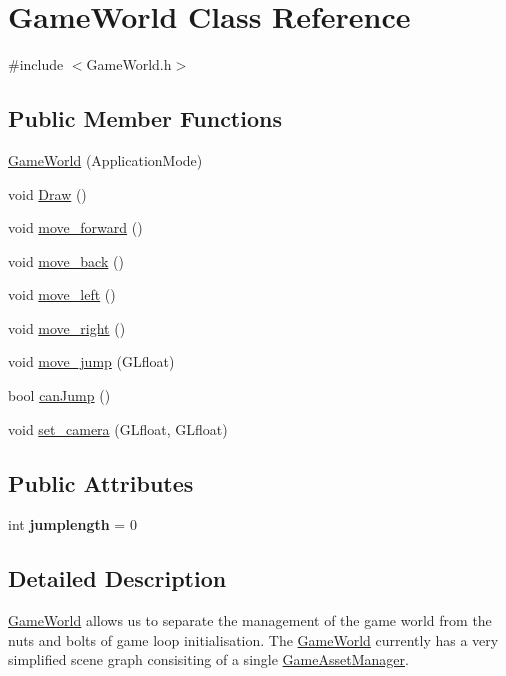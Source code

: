 \hypertarget{classGameWorld}{}\section{Game\+World Class Reference}
\label{classGameWorld}


{\ttfamily \#include $<$Game\+World.\+h$>$}

\subsection*{Public Member Functions}
\begin{DoxyCompactItemize}
\item 
\hyperlink{classGameWorld_a17a84e57a80600961088afc753036f89}{Game\+World} (Application\+Mode)
\item 
void \hyperlink{classGameWorld_a275418607d8286979b276f165ad5876b}{Draw} ()
\item 
void \hyperlink{classGameWorld_a863eb5b4a6d30e050543490b73c03351}{move\+\_\+forward} ()
\item 
void \hyperlink{classGameWorld_a0a6ee18221d04443c70a63951f098f10}{move\+\_\+back} ()
\item 
void \hyperlink{classGameWorld_a87e9cc176c5958342b54e33e76bf6227}{move\+\_\+left} ()
\item 
void \hyperlink{classGameWorld_a96063357a010c28ba7ef3ceb691fc897}{move\+\_\+right} ()
\item 
void \hyperlink{classGameWorld_a827a524c738a252fe1ab87f45fcece71}{move\+\_\+jump} (G\+Lfloat)
\item 
bool \hyperlink{classGameWorld_a9b35d52aa5239be36a480df580c517f8}{can\+Jump} ()
\item 
void \hyperlink{classGameWorld_adf31c1e081b761f1510f0f4053c7f463}{set\+\_\+camera} (G\+Lfloat, G\+Lfloat)
\end{DoxyCompactItemize}
\subsection*{Public Attributes}
\begin{DoxyCompactItemize}
\item 
int {\bfseries jumplength} = 0\hypertarget{classGameWorld_ad2297c4f2d1f8f97bd553a2d1d48a532}{}\label{classGameWorld_ad2297c4f2d1f8f97bd553a2d1d48a532}

\end{DoxyCompactItemize}


\subsection{Detailed Description}
\hyperlink{classGameWorld}{Game\+World} allows us to separate the management of the game world from the nuts and bolts of game loop initialisation. The \hyperlink{classGameWorld}{Game\+World} currently has a very simplified scene graph consisiting of a single \hyperlink{classGameAssetManager}{Game\+Asset\+Manager}. 

